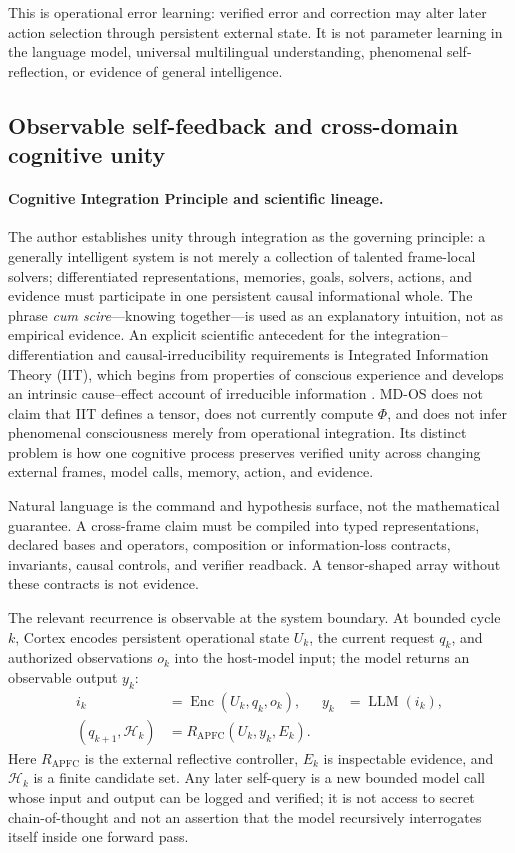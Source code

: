 \documentclass[10pt,twocolumn]{article}
\theoremstyle{definition}
\theoremstyle{plain}
\theoremstyle{remark}
\begin{document}
This is operational error learning: verified error and correction may alter later action selection through persistent external state.  It is not parameter learning in the language model, universal multilingual understanding, phenomenal self-reflection, or evidence of general intelligence.

\subsection{Observable self-feedback and cross-domain cognitive unity}
\label{sec:cognitive-unity}

\paragraph{Cognitive Integration Principle and scientific lineage.}
The author establishes unity through integration as the governing principle: a generally intelligent system is not merely a collection of talented frame-local solvers; differentiated representations, memories, goals, solvers, actions, and evidence must participate in one persistent causal informational whole.  The phrase \emph{cum scire}---knowing together---is used as an explanatory intuition, not as empirical evidence.  An explicit scientific antecedent for the integration--differentiation and causal-irreducibility requirements is Integrated Information Theory (IIT), which begins from properties of conscious experience and develops an intrinsic cause--effect account of irreducible information \citep{tononi2004iit,oizumi2014iit,albantakis2023iit4}.  MD-OS does not claim that IIT defines a tensor, does not currently compute $\Phi$, and does not infer phenomenal consciousness merely from operational integration.  Its distinct problem is how one cognitive process preserves verified unity across changing external frames, model calls, memory, action, and evidence.

Natural language is the command and hypothesis surface, not the mathematical guarantee.  A cross-frame claim must be compiled into typed representations, declared bases and operators, composition or information-loss contracts, invariants, causal controls, and verifier readback.  A tensor-shaped array without these contracts is not evidence.

The relevant recurrence is observable at the system boundary.  At bounded cycle $k$, Cortex encodes persistent operational state $U_k$, the current request $q_k$, and authorized observations $o_k$ into the host-model input; the model returns an observable output $y_k$:
\begin{align}
i_k &= \operatorname{Enc}(U_k,q_k,o_k), & y_k &= \operatorname{LLM}(i_k),\\
(q_{k+1},\mathcal{H}_k) &= R_{\mathrm{APFC}}(U_k,y_k,E_k).
\label{eq:observable-recurrence}
\end{align}
Here $R_{\mathrm{APFC}}$ is the external reflective controller, $E_k$ is inspectable evidence, and $\mathcal{H}_k$ is a finite candidate set.  Any later self-query is a new bounded model call whose input and output can be logged and verified; it is not access to secret chain-of-thought and not an assertion that the model recursively interrogates itself inside one forward pass.
\end{document}
